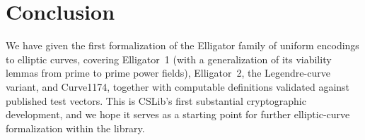 \section{Conclusion}
\label{sec:conclusion}

We have given the first formalization of the Elligator family of
uniform encodings to elliptic curves, covering Elligator~1 (with a
generalization of its viability lemmas from prime to prime power
fields), Elligator~2, the Legendre-curve variant, and Curve1174,
together with computable definitions validated against published
test vectors. This is CSLib's first substantial cryptographic
development, and we hope it serves as a starting point for further
elliptic-curve formalization within the library.

